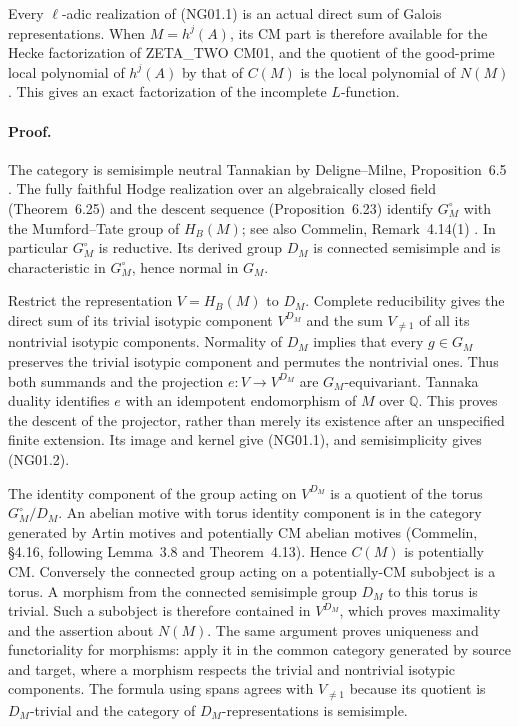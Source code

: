 Every $\ell$-adic realization of (NG01.1) is an actual direct sum of
Galois representations.  When $M=h^j(A)$, its CM part is therefore
available for the Hecke factorization of ZETA\_TWO CM01, and the quotient
of the good-prime local polynomial of $h^j(A)$ by that of $C(M)$ is the
local polynomial of $N(M)$.  This gives an exact factorization of the
incomplete $L$-function.

\paragraph{Proof.}
The category is semisimple neutral Tannakian by Deligne--Milne,
Proposition~6.5 \cite{NGDeligneMilne}.  The fully faithful Hodge realization over an
algebraically closed field (Theorem~6.25) and the descent sequence
(Proposition~6.23) identify $G_M^\circ$ with the Mumford--Tate group of
$H_B(M)$; see also Commelin, Remark~4.14(1) \cite{NGCommelin}.  In particular $G_M^\circ$
is reductive.  Its derived group $D_M$ is connected semisimple and is
characteristic in $G_M^\circ$, hence normal in $G_M$.

Restrict the representation $V=H_B(M)$ to $D_M$.  Complete reducibility
gives the direct sum of its trivial isotypic component $V^{D_M}$ and
the sum $V_{\ne1}$ of all its nontrivial isotypic components.  Normality
of $D_M$ implies that every $g\in G_M$ preserves the trivial isotypic
component and permutes the nontrivial ones.  Thus both summands and the
projection $e:V\to V^{D_M}$ are $G_M$-equivariant.  Tannaka duality
identifies $e$ with an idempotent endomorphism of $M$ over $\mathbb Q$.
This proves the descent of the projector, rather than merely its
existence after an unspecified finite extension.  Its image and kernel
give (NG01.1), and semisimplicity gives (NG01.2).

The identity component of the group acting on $V^{D_M}$ is a quotient
of the torus $G_M^\circ/D_M$.  An abelian motive with torus identity
component is in the category generated by Artin motives and potentially
CM abelian motives (Commelin, \S4.16, following Lemma~3.8 and
Theorem~4.13).  Hence $C(M)$ is potentially CM.  Conversely the connected
group acting on a potentially-CM subobject is a torus.  A morphism from
the connected semisimple group $D_M$ to this torus is trivial.  Such a
subobject is therefore contained in $V^{D_M}$, which proves maximality
and the assertion about $N(M)$.  The same argument proves uniqueness
and functoriality for morphisms: apply it in the common category
generated by source and target, where a morphism respects the trivial
and nontrivial isotypic components.  The formula using spans agrees with
$V_{\ne1}$ because its quotient is $D_M$-trivial and the category of
$D_M$-representations is semisimple.

